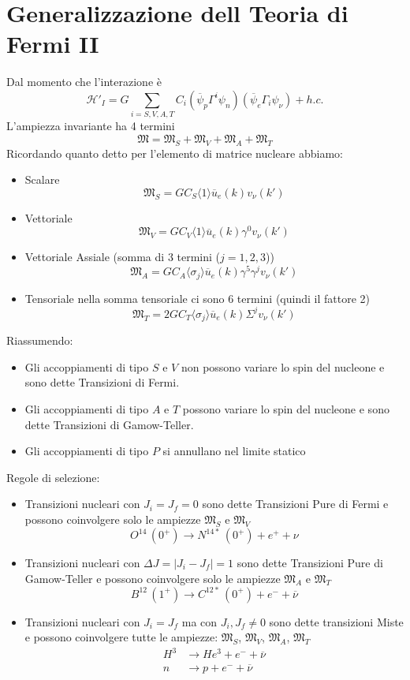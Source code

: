\section{Generalizzazione dell Teoria di Fermi II}
Dal momento che l'interazione è
$$
\mathcal{H}'_I = G \sum_{i=S,V,A,T} C_i (\overline{\psi}_p \Gamma^i \psi_n) (\overline{\psi}_e \Gamma_i \psi_\nu) + h.c.
$$
L'ampiezza invariante ha 4 termini
$$
\mathfrak{M} = \mathfrak{M}_S + \mathfrak{M}_V + \mathfrak{M}_A + \mathfrak{M}_T
$$
Ricordando quanto detto per l'elemento di matrice nucleare abbiamo:
\begin{itemize}
    \item Scalare
    $$
    \mathfrak{M}_S = G C_S \langle 1 \rangle \overline{u}_e(k) v_\nu(k')
    $$
    \item Vettoriale
    $$
    \mathfrak{M}_V = G C_V \langle 1 \rangle \overline{u}_e(k) \gamma^0 v_\nu(k')
    $$
    \item Vettoriale Assiale (somma di $3$ termini ($j=1,2,3$))
    $$
    \mathfrak{M}_A = G C_A \langle \sigma_j \rangle \overline{u}_e(k) \gamma^5 \gamma^j v_\nu(k')
    $$
    \item Tensoriale nella somma tensoriale ci sono 6 termini (quindi il fattore 2)
    $$
    \mathfrak{M}_T = 2 G C_T \langle \sigma_j \rangle \overline{u}_e(k) \Sigma^{j} v_\nu(k')
    $$
\end{itemize}
Riassumendo: 
\begin{itemize}
    \item Gli accoppiamenti di tipo $S$ e $V$ non possono variare lo spin del nucleone e sono dette Transizioni di Fermi.
    \item Gli accoppiamenti di tipo $A$ e $T$ possono variare lo spin del nucleone e sono dette Transizioni di Gamow-Teller.
    \item Gli accoppiamenti di tipo $P$ si annullano nel limite statico
\end{itemize}
Regole di selezione: 
\begin{itemize}
    \item Transizioni nucleari con $J_i=J_f=0$ sono dette Transizioni Pure di Fermi e possono coinvolgere solo le ampiezze $\mathfrak{M}_S$ e $\mathfrak{M}_V$
    $$
    O^{14} \, (0^+) \to N^{14*} \, (0^+) + e^+ + \nu
    $$  
    \item Transizioni nucleari con $\Delta J=|J_i-J_f|=1$ sono dette Transizioni Pure di Gamow-Teller e possono coinvolgere solo le ampiezze $\mathfrak{M}_A$ e $\mathfrak{M}_T$
    $$
    B^{12} \, (1^+) \to C^{12*} \, (0^+) + e^- + \overline{\nu}
    $$
    \item Transizioni nucleari con $J_i=J_f$ ma con $J_i,J_f\not=0$ sono dette transizioni Miste e possono coinvolgere tutte le ampiezze: $\mathfrak{M}_S$, $\mathfrak{M}_V$, $\mathfrak{M}_A$, $\mathfrak{M}_T$
    $$
    \begin{aligned}
    H^3 &\to He^3 + e^- + \overline{\nu} \\
    n &\to p + e^- + \overline{\nu}
    \end{aligned}
    $$
\end{itemize}
